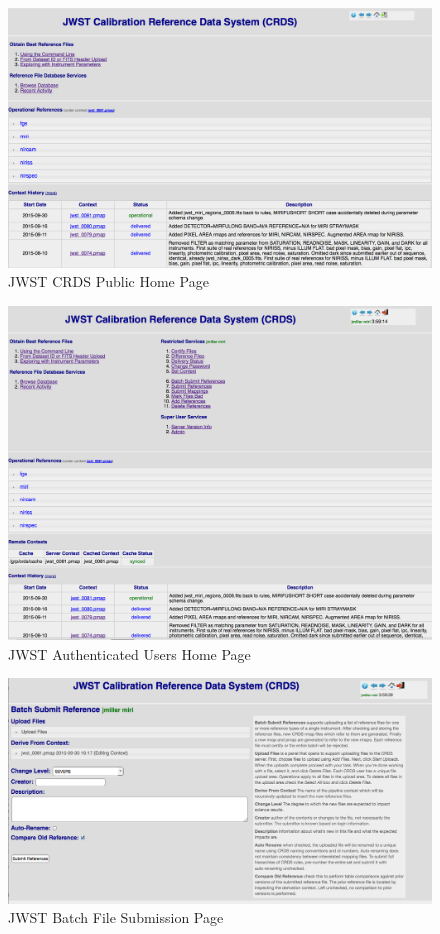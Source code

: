 \documentclass[final,authoryear,5p,times,twocolumn]{elsarticle}
\begin{document}
\begin{figure}[ht!]
\centering
\includegraphics[width=180mm]{JWST_Public_Home_Page.png}
\caption{JWST CRDS Public Home Page}
\label{fig:publichome}
\end{figure}

\begin{figure}[ht!]
\centering
\includegraphics[width=180mm]{JWST_Authenticated_Home.png}
\caption{JWST Authenticated Users Home Page}
\label{fig:authenticatedhome}
\end{figure}

\begin{figure}[ht!]
\centering
\includegraphics[width=180mm]{JWST_Batch_File_Submission.png}
\caption{JWST Batch File Submission Page}
\label{fig:batchsubmission}
\end{figure}
\end{document}
